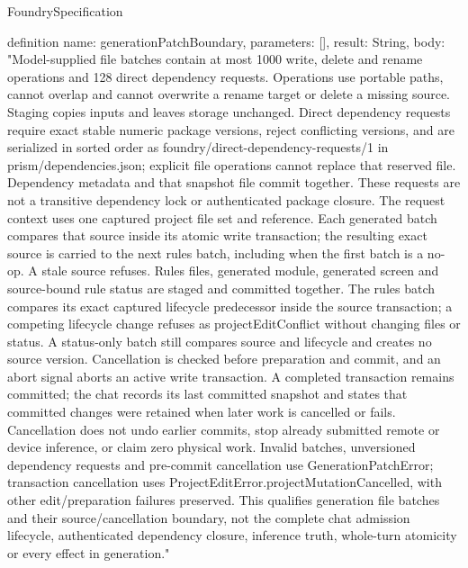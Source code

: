 \begin{lexlean}{FoundrySpecification}
\begin{semanticmodule}
definition{
  name: generationPatchBoundary,
  parameters: [],
  result: String,
  body: "Model-supplied file batches contain at most 1000 write, delete and rename operations and 128 direct dependency requests. Operations use portable paths, cannot overlap and cannot overwrite a rename target or delete a missing source. Staging copies inputs and leaves storage unchanged. Direct dependency requests require exact stable numeric package versions, reject conflicting versions, and are serialized in sorted order as foundry/direct-dependency-requests/1 in prism/dependencies.json; explicit file operations cannot replace that reserved file. Dependency metadata and that snapshot file commit together. These requests are not a transitive dependency lock or authenticated package closure. The request context uses one captured project file set and reference. Each generated batch compares that source inside its atomic write transaction; the resulting exact source is carried to the next rules batch, including when the first batch is a no-op. A stale source refuses. Rules files, generated module, generated screen and source-bound rule status are staged and committed together. The rules batch compares its exact captured lifecycle predecessor inside the source transaction; a competing lifecycle change refuses as projectEditConflict without changing files or status. A status-only batch still compares source and lifecycle and creates no source version. Cancellation is checked before preparation and commit, and an abort signal aborts an active write transaction. A completed transaction remains committed; the chat records its last committed snapshot and states that committed changes were retained when later work is cancelled or fails. Cancellation does not undo earlier commits, stop already submitted remote or device inference, or claim zero physical work. Invalid batches, unversioned dependency requests and pre-commit cancellation use GenerationPatchError; transaction cancellation uses ProjectEditError.projectMutationCancelled, with other edit/preparation failures preserved. This qualifies generation file batches and their source/cancellation boundary, not the complete chat admission lifecycle, authenticated dependency closure, inference truth, whole-turn atomicity or every effect in generation."
}


\end{semanticmodule}
\end{lexlean}

